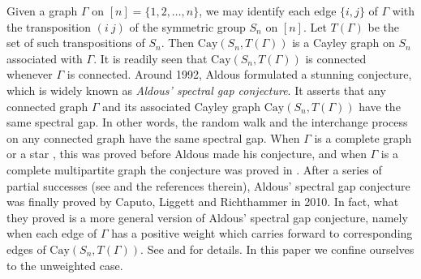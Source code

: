 \documentclass[12pt, a4paper]{article}
\theoremstyle{definition}
\begin{document}
Given a graph $\Gamma$ on $[n] = \{1, 2, \ldots, n\}$, we may identify each edge $\{i,j\}$ of $\Gamma$ with the transposition $(i\ j)$ of the symmetric group $S_n$ on $[n]$. Let $T(\Gamma)$ be the set of such transpositions of $S_n$. Then $\mathrm{Cay}(S_n, T(\Gamma))$ is a Cayley graph on $S_n$ associated with $\Gamma$. It is readily seen that $\mathrm{Cay}(S_n, T(\Gamma))$ is connected whenever $\Gamma$ is connected. Around 1992, Aldous \cite{A1} formulated a stunning conjecture, which is widely known as \emph{Aldous' spectral gap conjecture}. It asserts that any connected graph $\Gamma$ and its associated Cayley graph $\mathrm{Cay}(S_n, T(\Gamma))$ have the same spectral gap. In other words, the random walk and the interchange process on any connected graph have the same spectral gap. When $\Gamma$ is a complete graph \cite{DS} or a star \cite{FOW}, this was proved before Aldous made his conjecture, and when $\Gamma$ is a complete multipartite graph the conjecture was proved in \cite{C}. After a series of partial successes (see \cite{C3} and the references therein), Aldous' spectral gap conjecture was finally proved by Caputo, Liggett and Richthammer \cite{CLR} in 2010. In fact, what they proved is a more general version of Aldous' spectral gap conjecture, namely when each edge of $\Gamma$ has a positive weight which carries forward to corresponding edges of $\mathrm{Cay}(S_n, T(\Gamma))$. See \cite{CLR, C2, C3} and \cite[Section 8.1]{LZ} for details. In this paper we confine ourselves to the unweighted case.
\end{document}
